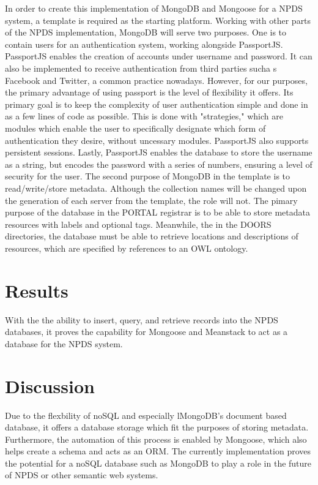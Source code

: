 \documentclass[10pt,twocolumn,twoside]{article}
\begin{document}
	In order to create this implementation of MongoDB and Mongoose for a NPDS system, a template is required as the starting platform. Working with other parts of the NPDS implementation, MongoDB will serve two purposes. One is to contain users for an authentication system, working alongside PassportJS. PassportJS enables the creation of accounts under username and password. It can also be implemented to receive authentication from third parties sucha s Facebook and Twitter, a common practice nowadays. However, for our purposes, the primary advantage of using passport is the level of flexibility it offers. Its primary goal is to keep the complexity of user authentication simple and done in as a few lines of code as possible. This is done with "strategies," which are modules which enable the user to specifically designate which form of authentication they desire, without uncessary modules. PassportJS also supports persistent sessions. Lastly, PassportJS enables the database to store the username as a string, but encodes the password with a series of numbers, ensuring a level of security for the user. The second purpose of MongoDB in the template is to read/write/store metadata. Although the collection names will be changed upon the generation of each server from the template, the role will not. The pimary purpose of the database in the PORTAL registrar is to be able to store metadata resources with labels and optional tags. Meanwhile, the in the DOORS directories, the database must be able to retrieve locations and descriptions of resources, which are specified by references to an OWL ontology.

\section*{Results}
	With the the ability to insert, query, and retrieve records into the NPDS databases, it proves the capability for Mongoose and Meanstack to act as a database for the NPDS system. 


\section*{Discussion}
	Due to the flexbility of noSQL and especially lMongoDB's document based database, it offers a database storage which fit the purposes of storing metadata. Furthermore, the automation of this process is enabled by Mongoose, which also helps create a schema and acts as an ORM. The currently implementation proves the potential for a noSQL database such as MongoDB to play a role in the future of NPDS or other semantic web systems. 
\end{document}
